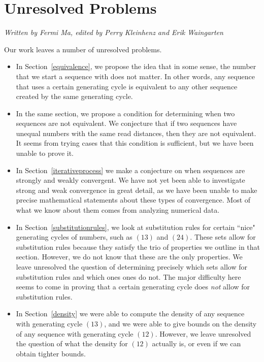 \documentclass[runningheads,a4paper]{llncs}
\begin{document}
\section{Unresolved Problems}
\emph{Written by Fermi Ma, edited by Perry Kleinhenz and Erik Waingarten}

Our work leaves a number of unresolved problems. 

\begin{itemize}
\item In Section~\ref{equivalence}, we propose the idea that in some sense, the number that we start a sequence with does not matter. In other words, any sequence that uses a certain generating cycle is equivalent to any other sequence created by the same generating cycle.
\item In the same section, we propose a condition for determining when two sequences are not equivalent. We conjecture that if two sequences have unequal numbers with the same read distances, then they are not equivalent. It seems from trying cases that this condition is sufficient, but we have been unable to prove it.
\item In Section~\ref{iterativeprocess} we make a conjecture on when sequences are strongly and weakly convergent. We have not yet been able to investigate strong and weak convergence in great detail, as we have been unable to make precise mathematical statements about these types of convergence. Most of what we know about them comes from analyzing numerical data.
\item In Section~\ref{substitutionrules}, we look at substitution rules for certain ``nice" generating cycles of numbers, such as $(13)$ and $(24)$. These sets allow for substitution rules because they satisfy the trio of properties we outline in that section. However, we do not know that these are the only properties. We leave unresolved the question of determining precisely which sets allow for substitution rules and which ones ones do not. The major difficulty here seems to come in proving that a certain generating cycle does \emph{not} allow for substitution rules.
\item In Section~\ref{density} we were able to compute the density of any sequence with generating cycle $(13)$, and we were able to give bounds on the density of any sequence with generating cycle $(12)$. However, we leave unresolved the question of what the density for $(12)$ actually is, or even if we can obtain tighter bounds.
\end{itemize}
\end{document}

